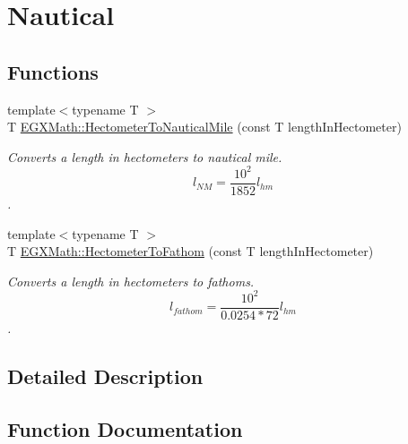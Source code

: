 \hypertarget{group___e_g_x_math-_conversions-_length_conversions-_s_i-_hectometer-_nautical}{}\section{Nautical}
\label{group___e_g_x_math-_conversions-_length_conversions-_s_i-_hectometer-_nautical}
\subsection*{Functions}
\begin{DoxyCompactItemize}
\item 
{\footnotesize template$<$typename T $>$ }\\T \mbox{\hyperlink{group___e_g_x_math-_conversions-_length_conversions-_s_i-_hectometer-_nautical_ga74e84be72b4e2272d547b5d7e21211dc}{E\+G\+X\+Math\+::\+Hectometer\+To\+Nautical\+Mile}} (const T length\+In\+Hectometer)
\begin{DoxyCompactList}\small\item\em Converts a length in hectometers to nautical mile. \[ l_{NM}= \frac{10^{2}}{1852} l_{hm} \]. \end{DoxyCompactList}\item 
{\footnotesize template$<$typename T $>$ }\\T \mbox{\hyperlink{group___e_g_x_math-_conversions-_length_conversions-_s_i-_hectometer-_nautical_ga487d637d16d2468a9969ab3a4f50eeb1}{E\+G\+X\+Math\+::\+Hectometer\+To\+Fathom}} (const T length\+In\+Hectometer)
\begin{DoxyCompactList}\small\item\em Converts a length in hectometers to fathoms. \[ l_{fathom}= \frac{10^{2}}{0.0254 * 72} l_{hm} \]. \end{DoxyCompactList}\end{DoxyCompactItemize}


\subsection{Detailed Description}


\subsection{Function Documentation}
\mbox{\label{group___e_g_x_math-_conversions-_length_conversions-_s_i-_hectometer-_nautical_ga487d637d16d2468a9969ab3a4f50eeb1}} 
